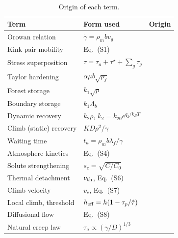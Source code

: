 \documentclass[aps,prl,onecolumn,superscriptaddress,amsmath,amssymb,floatfix]{revtex4-2}
\newcommand{\gd}{\dot\gamma}
\newcommand{\ts}{\tau^{\star}}
\newcommand{\kT}{k_BT}
\begin{document}
\begin{table}[h]
\caption{Origin of each term.}
\label{tab:origin}
\begin{ruledtabular}
\begin{tabular}{lll}
Term & Form used & Origin\\
\hline
Orowan relation & $\gd=\rho_mbv_g$ & \cite{S_Orowan1940}\\
Kink-pair mobility & Eq.~(S1) & \cite{S_Po2016,S_KAA1975,S_DR1964}\\
Stress superposition & $\tau=\tau_a+\ts+\sum_g\tau_g$ & \cite{S_Seeger1958,S_KAA1975}\\
Taylor hardening & $\alpha\mu b\sqrt{\rho_f}$ & \cite{S_Taylor1934,S_KM2003}\\
Forest storage & $k_1\sqrt\rho$ & \cite{S_Kocks1976,S_MK1981}\\
Boundary storage & $k_1\Lambda_b$ & \cite{S_EM1984,S_Estrin1996}\\
Dynamic recovery & $k_2\rho$, $k_2=k_{20}e^{q_2/\kT}$ & \cite{S_Kocks1976,S_MK1981,S_KM2003}\\
Climb (static) recovery & $KD\rho^2/\gd$ & \cite{S_KMR1949,S_SL1975,S_S1977,S_Nes1995,S_SH2012}\\
Waiting time & $t_a=\rho_mb\lambda_f/\gd$ & \cite{S_McC1988,S_KE1990}\\
Atmosphere kinetics & Eq.~(S4) & \cite{S_CB1949,S_Louat1981,S_Cheng2001}\\
Solute strengthening & $s_c=\sqrt{C/C_0}$ & \cite{S_Cheng2001,S_MuK1979}\\
Thermal detachment & $\nu_{\rm th}$, Eq.~(S6) & \cite{S_KAA1975,S_RA1990}\\
Climb velocity & $v_c$, Eq.~(S7) & \cite{S_HL1982}\\
Local climb, threshold & $h_{\rm eff}=h(1-\tau_p/\hat\tau)$ & \cite{S_BrownHam,S_AA1982}\\
Diffusional flow & Eq.~(S8) & \cite{S_Nabarro1948,S_Herring1950,S_Coble1963,S_FA1982}\\
Natural creep law & $\tau_a\propto(\gd/D)^{1/3}$ & \cite{S_Poirier1985,S_Blum2002}\\
\end{tabular}
\end{ruledtabular}
\end{table}
\end{document}

